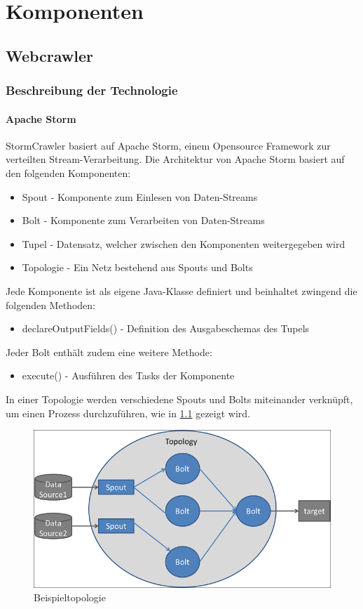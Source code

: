 \chapter{Komponenten}
\section{Webcrawler}
\subsection{Beschreibung der Technologie}
\subsubsection{Apache Storm}
StormCrawler basiert auf Apache Storm, einem Opensource Framework zur verteilten Stream-Verarbeitung.
Die Architektur von Apache Storm basiert auf den folgenden Komponenten:
\begin{itemize}
	\item Spout - Komponente zum Einlesen von Daten-Streams
	\item Bolt - Komponente zum Verarbeiten von Daten-Streams
	\item Tupel - Datensatz, welcher zwischen den Komponenten weitergegeben wird
	\item Topologie - Ein Netz bestehend aus Spouts und Bolts
\end{itemize}
Jede Komponente ist als eigene Java-Klasse definiert und beinhaltet zwingend die folgenden Methoden:
\begin{itemize}
	\item declareOutputFields() - Definition des Ausgabeschemas des Tupels
\end{itemize}
Jeder Bolt enthält zudem eine weitere Methode:
\begin{itemize}
	\item execute() - Ausführen des Tasks der Komponente
\end{itemize}
In einer Topologie werden verschiedene Spouts und Bolts miteinander verknüpft, um einen Prozess durchzuführen, wie in \cref{fig:topology} gezeigt wird.
\begin{figure}[H]	
	\includegraphics[width=0.8\columnwidth,keepaspectratio]{img/storm-topology.png}
	\caption{Beispieltopologie}
	\label{fig:topology}
\end{figure}
